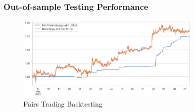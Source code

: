 \documentclass[11pt,a4paper]{article}
\begin{document}
    \subsubsection{Out-of-sample Testing Performance}
    \begin{figure}[H]
        \centering
        \includegraphics[width = 0.8\textwidth]{crypto/plot/backtest.png}
        \caption{Pairs Trading Backtesting}
        \label{fig:crypto_backtest}
    \end{figure}
    
\end{document}
